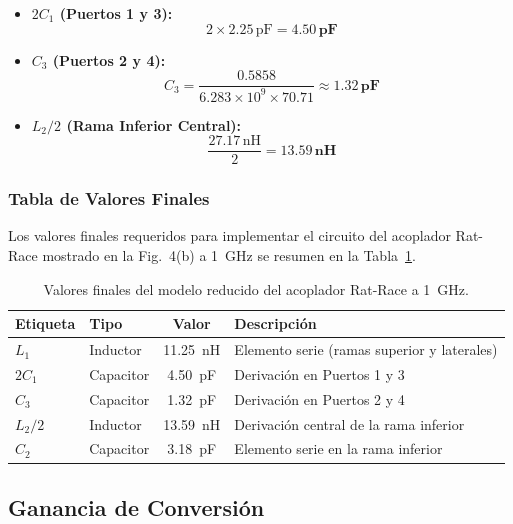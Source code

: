 \begin{itemize}
    \item \textbf{$2C_1$ (Puertos 1 y 3):}
    \[
        2 \times 2.25\,\text{pF} = \mathbf{4.50\,\text{pF}}
    \]

    \item \textbf{$C_3$ (Puertos 2 y 4):}
    \[
        C_3 = \frac{0.5858}{6.283 \times 10^9 \times 70.71}
        \approx \mathbf{1.32\,\text{pF}}
    \]

    \item \textbf{$L_2/2$ (Rama Inferior Central):}
    \[
        \frac{27.17\,\text{nH}}{2} = \mathbf{13.59\,\text{nH}}
    \]
\end{itemize}

\subsubsection{Tabla de Valores Finales}

Los valores finales requeridos para implementar el circuito del acoplador Rat-Race
mostrado en la Fig.~4(b) a \SI{1}{\giga\hertz} se resumen en la Tabla~\ref{tab:rat_race_valores}.

\begin{table}[h]
\centering
\begin{tabular}{@{}llcl@{}}
\toprule
\textbf{Etiqueta} & \textbf{Tipo} & \textbf{Valor} & \textbf{Descripción} \\ \midrule
$L_1$   & Inductor     & \SI{11.25}{\nano\henry} & Elemento serie (ramas superior y laterales) \\
$2C_1$  & Capacitor  & \SI{4.50}{\pico\farad} & Derivación en Puertos 1 y 3 \\
$C_3$   & Capacitor  & \SI{1.32}{\pico\farad} & Derivación en Puertos 2 y 4 \\
$L_2/2$ & Inductor     & \SI{13.59}{\nano\henry} & Derivación central de la rama inferior \\
$C_2$   & Capacitor  & \SI{3.18}{\pico\farad} & Elemento serie en la rama inferior \\ \bottomrule
\end{tabular}
\caption{Valores finales del modelo reducido del acoplador Rat-Race a \SI{1}{\giga\hertz}.}
\label{tab:rat_race_valores}
\end{table}
 
\subsection{Ganancia de Conversión }

